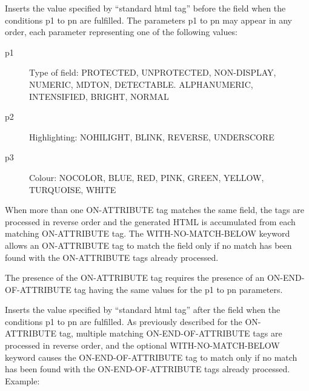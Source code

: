 \documentclass[letterpaper,10pt,english]{sphinxmanual}
\begin{document}
Inserts the value specified by “standard html tag” before the field when the conditions p1 to pn are fulfilled. The
parameters p1 to pn may appear in any order, each parameter representing one of the following values:
\begin{description}
\item[{p1}] \leavevmode
Type of field: PROTECTED, UNPROTECTED, NON-DISPLAY, NUMERIC, MDTON, DETECTABLE. ALPHANUMERIC, INTENSIFIED, BRIGHT, NORMAL

\item[{p2}] \leavevmode
Highlighting: NOHILIGHT, BLINK, REVERSE, UNDERSCORE

\item[{p3}] \leavevmode
Colour: NOCOLOR, BLUE, RED, PINK, GREEN, YELLOW, TURQUOISE, WHITE

\end{description}

When more than one ON-ATTRIBUTE tag matches the same field, the tags are processed in reverse order and the
generated HTML is accumulated from each matching ON-ATTRIBUTE tag. The WITH-NO-MATCH-BELOW keyword
allows an ON-ATTRIBUTE tag to match the field only if no match has been found with the ON-ATTRIBUTE tags already
processed.


The presence of the ON-ATTRIBUTE tag requires the presence of an ON-END-OF-ATTRIBUTE tag having the same values
for the p1 to pn parameters.

\begin{sphinxVerbatim}[commandchars=\\\{\}]
     
\end{sphinxVerbatim}

Inserts the value specified by “standard html tag” after the field when the conditions p1 to pn are fulfilled.
As previously described for the ON-ATTRIBUTE tag, multiple matching ON-END-OF-ATTRIBUTE tags are processed in
reverse order, and the optional WITH-NO-MATCH-BELOW keyword causes the ON-END-OF-ATTRIBUTE tag to match
only if no match has been found with the ON-END-OF-ATTRIBUTE tags already processed.
Example:
\end{document}

